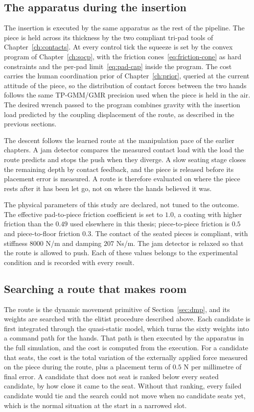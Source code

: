 \subsection{The apparatus during the insertion}

The insertion is executed by the same apparatus as the rest of the pipeline. The piece is held across its thickness by the two compliant tri-pad tools of Chapter~\ref{ch:contacts}. At every control tick the squeeze is set by the convex program of Chapter~\ref{ch:socp}, with the friction cones~\eqref{eq:friction-cone} as hard constraints and the per-pad limit~\eqref{eq:pad-cap} inside the program. The cost carries the human coordination prior of Chapter~\ref{ch:prior}, queried at the current attitude of the piece, so the distribution of contact forces between the two hands follows the same TP-GMM/GMR precision used when the piece is held in the air. The desired wrench passed to the program combines gravity with the insertion load predicted by the coupling displacement of the route, as described in the previous sections.

The descent follows the learned route at the manipulation pace of the earlier chapters. A jam detector compares the measured contact load with the load the route predicts and stops the push when they diverge. A slow seating stage closes the remaining depth by contact feedback, and the piece is released before its placement error is measured. A route is therefore evaluated on where the piece rests after it has been let go, not on where the hands believed it was.

The physical parameters of this study are declared, not tuned to the outcome. The effective pad-to-piece friction coefficient is set to $1.0$, a coating with higher friction than the $0.49$ used elsewhere in this thesis; piece-to-piece friction is $0.5$ and piece-to-floor friction $0.3$. The contact of the seated pieces is compliant, with stiffness $8000$ N/m and damping $207$ Ns/m. The jam detector is relaxed so that the route is allowed to push. Each of these values belongs to the experimental condition and is recorded with every result.

\subsection{Searching a route that makes room}

The route is the dynamic movement primitive of Section~\ref{sec:dmp}, and its weights are searched with the elitist procedure described above. Each candidate is first integrated through the quasi-static model, which turns the sixty weights into a command path for the hands. That path is then executed by the apparatus in the full simulation, and the cost is computed from the execution. For a candidate that seats, the cost is the total variation of the externally applied force measured on the piece during the route, plus a placement term of $0.5$ N per millimetre of final error. A candidate that does not seat is ranked below every seated candidate, by how close it came to the seat. Without that ranking, every failed candidate would tie and the search could not move when no candidate seats yet, which is the normal situation at the start in a narrowed slot.

